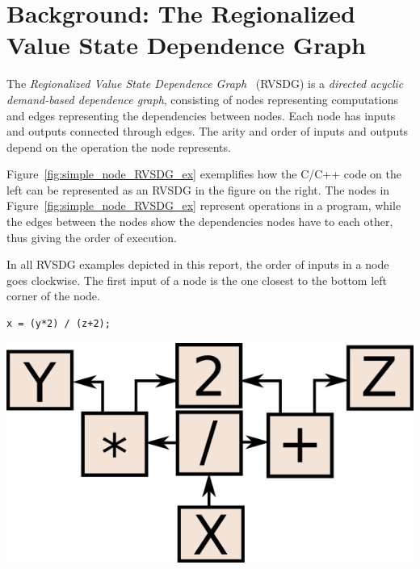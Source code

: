 
\clearpage
\section{Background: The Regionalized Value State Dependence Graph}
\label{background}
\label{background:RVSDG}

The \textit{Regionalized Value State Dependence Graph}~\cite{RVSDG:HiPEACpaper}
(RVSDG) is a \textit{directed acyclic demand-based dependence graph},
consisting of nodes representing computations and edges representing the
dependencies between nodes. Each node has inputs and outputs connected through
edges. The arity and order of inputs and outputs depend on the operation the
node represents.

Figure~\ref{fig:simple_node_RVSDG_ex} exemplifies how the C/C++ code on the left
can be represented as an RVSDG in the figure on the right. The nodes in
Figure~\ref{fig:simple_node_RVSDG_ex} represent operations in a program, while
the edges between the nodes show the dependencies nodes have to each other, thus
giving the order of execution.

In all RVSDG examples depicted in this report, the order of inputs in a node
goes clockwise. The first input of a node is the one closest to the bottom left
corner of the node.

\begin{centering}
	\noindent\begin{minipage}{0.36\textwidth}
		\begin{CenteredBox}
		\begin{lstlisting}[label={lst:simple_node_RVSDG_ex},
style=minipage_customcpp, basicstyle=\fontsize{10}{1}]
x = (y*2) / (z+2);
		\end{lstlisting}
		\end{CenteredBox}
	\end{minipage}
	\noindent\begin{minipage}{0.55\textwidth}
		\captionsetup{type=figure}
		\includegraphics[width=\textwidth]{figures/simple_node_RVSDG_ex}
	\end{minipage}
	\label{fig:simple_node_RVSDG_ex}
\end{centering}

